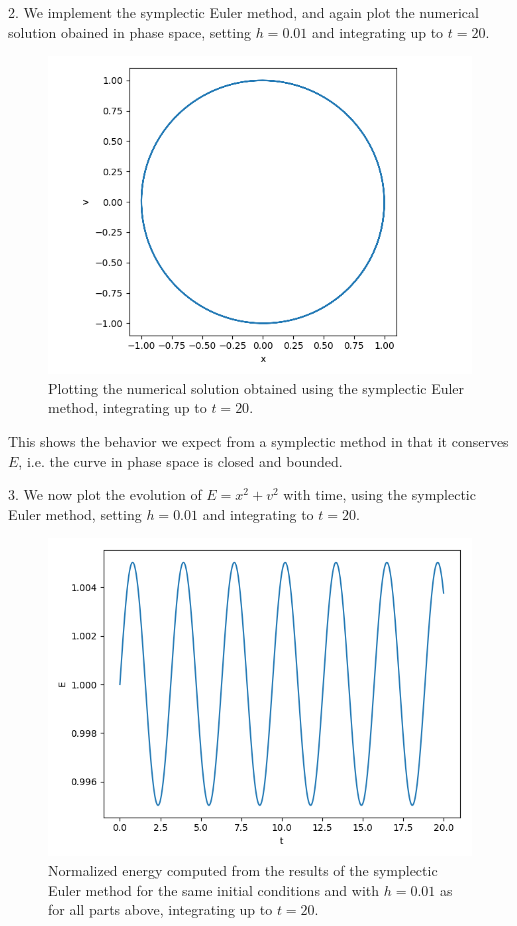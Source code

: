 \documentclass[11pt]{article}
\begin{document}
2. We implement the symplectic Euler method, and again plot the numerical solution obained in phase space, setting $h=0.01$ and integrating up to $t=20$. \\
\newpage

\begin{figure}[htp]
\centering
\includegraphics[scale=0.80]{symplectic_euler_phase.png}
\caption{Plotting the numerical solution obtained using the symplectic Euler method, integrating up to $t=20$.}
\label{sympphase}
\end{figure}

This shows the behavior we expect from a symplectic method in that it conserves $E$, i.e. the curve in phase space is closed and bounded.
\newpage

3. We now plot the evolution of $E=x^2+v^2$ with time, using the symplectic Euler method, setting $h=0.01$ and integrating to $t=20$. \\

\begin{figure}[htp]
\centering
\includegraphics[scale=0.80]{symplectic_euler_energy.png}
\caption{Normalized energy computed from the results of the symplectic Euler method for the same initial conditions and with $h=0.01$ as for all parts above, integrating up to $t=20$.}
\label{sympenergy}
\end{figure}
\end{document}
